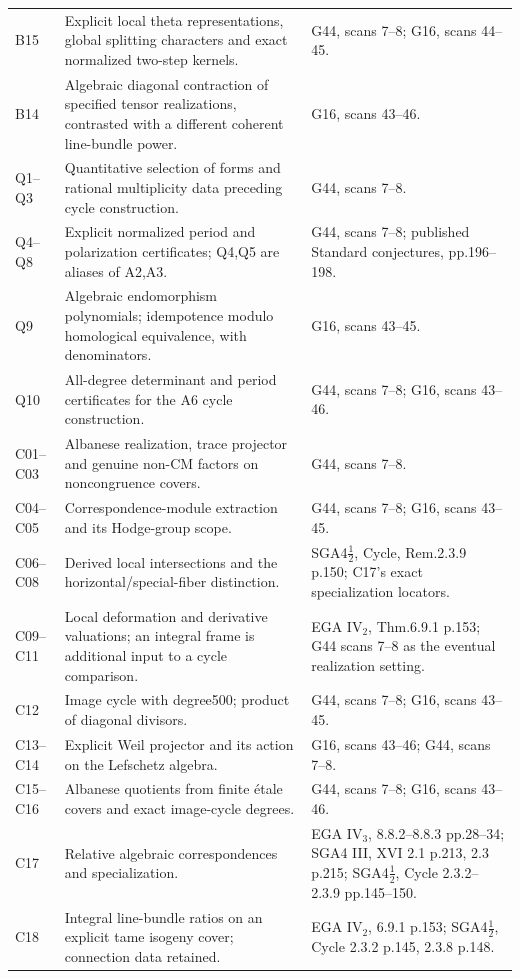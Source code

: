 \begin{longtable}{@{}p{.18\linewidth}p{.48\linewidth}p{.27\linewidth}@{}}
B15 & Explicit local theta representations, global splitting characters and exact normalized two-step kernels. & G44, scans 7--8; G16, scans 44--45.\\
B14 & Algebraic diagonal contraction of specified tensor realizations, contrasted with a different coherent line-bundle power. & G16, scans 43--46.\\
Q1--Q3 & Quantitative selection of forms and rational multiplicity data preceding cycle construction. & G44, scans 7--8.\\
Q4--Q8 & Explicit normalized period and polarization certificates; Q4,Q5 are aliases of A2,A3. & G44, scans 7--8; published Standard conjectures, pp.196--198.\\
Q9 & Algebraic endomorphism polynomials; idempotence modulo homological equivalence, with denominators. & G16, scans 43--45.\\
Q10 & All-degree determinant and period certificates for the A6 cycle construction. & G44, scans 7--8; G16, scans 43--46.\\
C01--C03 & Albanese realization, trace projector and genuine non-CM factors on noncongruence covers. & G44, scans 7--8.\\
C04--C05 & Correspondence-module extraction and its Hodge-group scope. & G44, scans 7--8; G16, scans 43--45.\\
C06--C08 & Derived local intersections and the horizontal/special-fiber distinction. & SGA4$\frac12$, Cycle, Rem.2.3.9 p.150; C17's exact specialization locators.\\
C09--C11 & Local deformation and derivative valuations; an integral frame is additional input to a cycle comparison. & EGA IV$_2$, Thm.6.9.1 p.153; G44 scans 7--8 as the eventual realization setting.\\
C12 & Image cycle with degree500; product of diagonal divisors. & G44, scans 7--8; G16, scans 43--45.\\
C13--C14 & Explicit Weil projector and its action on the Lefschetz algebra. & G16, scans 43--46; G44, scans 7--8.\\
C15--C16 & Albanese quotients from finite \'etale covers and exact image-cycle degrees. & G44, scans 7--8; G16, scans 43--46.\\
C17 & Relative algebraic correspondences and specialization. & EGA IV$_3$, 8.8.2--8.8.3 pp.28--34; SGA4 III, XVI 2.1 p.213, 2.3 p.215; SGA4$\frac12$, Cycle 2.3.2--2.3.9 pp.145--150.\\
C18 & Integral line-bundle ratios on an explicit tame isogeny cover; connection data retained. & EGA IV$_2$, 6.9.1 p.153; SGA4$\frac12$, Cycle 2.3.2 p.145, 2.3.8 p.148.\\
\bottomrule
\end{longtable}

